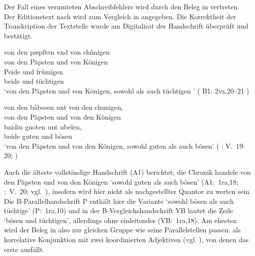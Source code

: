 Der Fall eines vermuteten Abschreibfehlers wird durch den Beleg in
 vertreten. Der Editionstext nach \citet{schroeder1895}
wird zum Vergleich in  angegeben. Die Korrektheit
der Transkription der Textstelle wurde am Digitalisat der Handschrift überprüft
und bestätigt.

\begin{exe}
\ex \begin{xlist}
	\ex \label{ex:kcexcl1}
		\gll von den pæpſten vnd von chûnigen \\
			von den Päpsten und von Königen \\
	\sn \gll Peide und frûmigen \\
			beide und tüchtigen \\
		\trans `von den Päpsten und von Königen, sowohl als auch tüchtigen
			'
			(%
				B1: 2va,20--21%
			)

	\ex \label{ex:kcexcl1_schroeder}
		\gll von den bâbesen unt von den chunigen, \\
			von den Päpsten und von den Königen \\
	\sn \gll baidiu guoten unt ubelen, \\
			beide guten und bösen \\
		\trans `von den Päpsten und von den Königen, sowohl guten als auch
			bösen'
			(%
				\KC: V.~19--20;
				\cite[79]{schroeder1895}%
			)
\end{xlist}
\end{exe}

Auch die älteste vollständige Handschrift (A1) berichtet, die Chronik handele
von den Päpsten und von den Königen  `sowohl guten
als auch bösen' (A1:~1ra,18; \KC:~V.~20; vgl.~\cite[79]{schroeder1895}),
insofern wird  hier nicht als nachgestellter Quantor zu werten
sein. Die B-\allowbreak{}Pa\-ral\-lel\-hand\-schrift P enthält hier die
Variante  `sowohl bösen als auch
tüchtige' (P:~1ra,10) und in der B-Vergleichshandschrift VB lautet
die Zeile  `bösen und tüchtigen', allerdings ohne
einleitendes  (VB:~1ra,18). Am ehesten wird der Beleg in
 also zur gleichen Gruppe wie seine Parallelstellen passen:
 als korrelative Konjunktion mit zwei koordinierten Adjektiven
(vgl. ), von denen das erste ausfällt.

